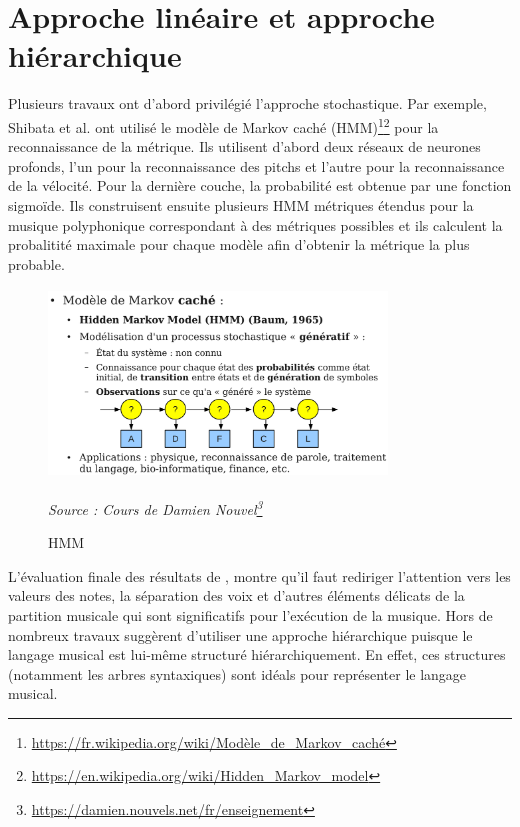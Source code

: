 \section{Approche linéaire et approche hiérarchique}
Plusieurs travaux ont d’abord privilégié l’approche stochastique. Par exemple, Shibata et al.\cite{SHIBATA2021262} ont utilisé le modèle de Markov caché (HMM)\footnote{\url{https://fr.wikipedia.org/wiki/Modèle_de_Markov_caché}}\footnote{\url{https://en.wikipedia.org/wiki/Hidden_Markov_model}} pour la reconnaissance de la métrique. Ils utilisent d’abord deux réseaux de neurones profonds, l’un pour la reconnaissance des pitchs et l’autre pour la reconnaissance de la vélocité. Pour la dernière couche, la probabilité est obtenue par une fonction sigmoïde. Ils construisent ensuite plusieurs HMM métriques étendus pour la musique polyphonique correspondant à des métriques possibles et ils calculent la probalitité maximale pour chaque modèle afin d’obtenir la métrique la plus probable.
\begin{figure}[h]
	\centering
	\includegraphics[height=50mm, width=90mm]{z_images/2_etat_de_l_art/hmm.png}
	\caption{HMM}
	\textit{Source : Cours de Damien Nouvel\footnote{\url{https://damien.nouvels.net/fr/enseignement}}}
\end{figure}

L’évaluation finale des résultats de \cite{SHIBATA2021262}, montre qu’il faut rediriger l’attention vers les valeurs des notes, la séparation des voix et d'autres éléments délicats de la partition musicale qui sont significatifs pour l'exécution de la musique. Hors de nombreux travaux suggèrent d’utiliser une approche hiérarchique puisque le langage musical est lui-même structuré hiérarchiquement. En effet, ces structures (notamment les arbres syntaxiques) sont idéals pour représenter le langage musical.
